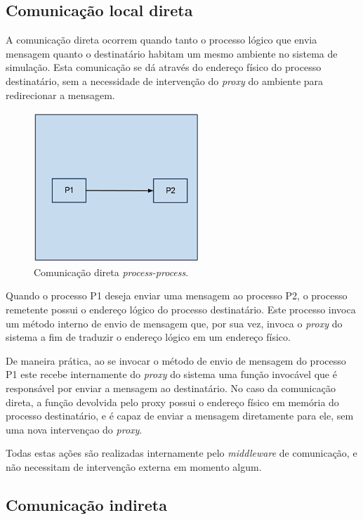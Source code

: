 \subsection{Comunicação local direta}

A comunicação direta ocorrem quando tanto o processo lógico que envia mensagem quanto o destinatário habitam um mesmo ambiente no sistema de simulação. Esta comunicação se dá através do endereço físico do processo destinatário, sem a necessidade de intervenção do \textit{proxy} do ambiente para redirecionar a mensagem.

\begin{figure}
  \centerline{\includegraphics{communication_superdirect.png}}
  \caption{Comunicação direta \textit{process-process}.}
\label{fig:direta_mesmo}
\end{figure}

Quando o processo P1 deseja enviar uma mensagem ao processo P2, o processo remetente possui o endereço lógico do processo destinatário. Este processo invoca um método interno de envio de mensagem que, por sua vez, invoca o \textit{proxy} do sistema a fim de traduzir o endereço lógico em um endereço físico.

De maneira prática, ao se invocar o método de envio de mensagem do processo P1 este recebe internamente do \textit{proxy} do sistema uma função invocável que é responsável por enviar a mensagem ao destinatário. No caso da comunicação direta, a função devolvida pelo proxy possui o endereço físico em memória do processo destinatário, e é capaz de enviar a mensagem diretamente para ele, sem uma nova intervençao do \textit{proxy}.

Todas estas ações são realizadas internamente pelo \textit{middleware} de comunicação, e não necessitam de intervenção externa em momento algum.

\subsection{Comunicação indireta}

